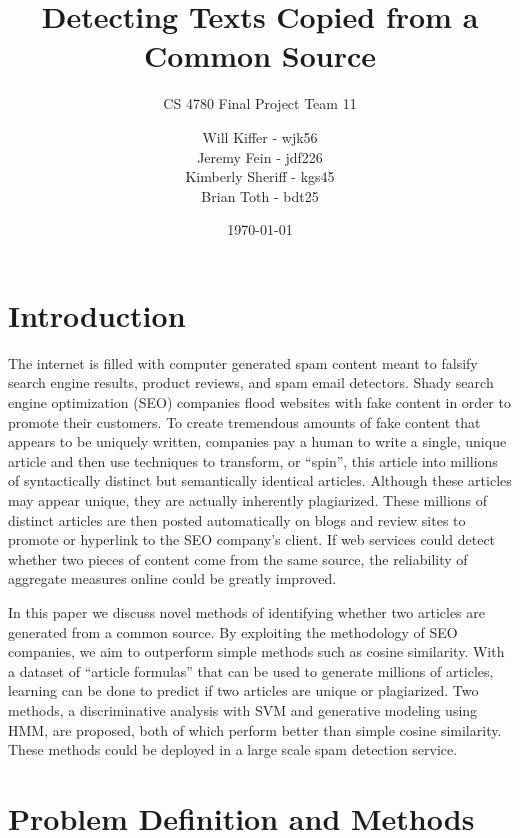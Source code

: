 \documentclass[11pt,letterpaper,oneside, titlepage]{scrartcl}
\begin{document}
\title{Detecting Texts Copied from a Common Source}
\subtitle{CS 4780 Final Project Team 11}
\date{\today}
\author{Will Kiffer - wjk56\\Jeremy Fein - jdf226\\Kimberly Sheriff - kgs45\\Brian Toth - bdt25}
\maketitle


\tableofcontents
\clearpage

\section{Introduction}

The internet is filled with computer generated spam content meant to falsify search engine results, product reviews, and spam email detectors. Shady search engine optimization (SEO) companies flood websites with fake content in order to promote their customers. To create tremendous amounts of fake content that appears to be uniquely written, companies pay a human to write a single, unique article and then use techniques to transform, or “spin”, this article into millions of syntactically distinct but semantically identical articles. Although these articles may appear unique, they are actually inherently plagiarized. These millions of distinct articles are then posted automatically on blogs and review sites to promote or hyperlink to the SEO company's client. If web services could detect whether two pieces of content come from the same source, the reliability of aggregate measures online could be greatly improved.

In this paper we discuss novel methods of identifying whether two articles are generated from a common source. By exploiting the methodology of SEO companies, we aim to outperform simple methods such as cosine similarity. With a dataset of “article formulas” that can be used to generate millions of articles, learning can be done to predict if two articles are unique or plagiarized. Two methods, a discriminative analysis with SVM and generative modeling using HMM, are proposed, both of which perform better than simple cosine similarity. These methods could be deployed in a large scale spam detection service.

\section{Problem Definition and Methods}
\end{document}

